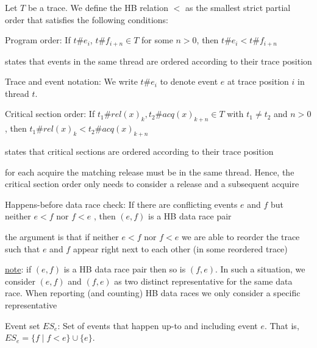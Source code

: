 \documentclass[landscape, a4paper]{article}
\begin{document}
\begin{minipage}[t]{0.2\linewidth}
\begin{betterlist}
\begin{betterlist}
			\item Let $T$ be a trace. We define the HB relation $<$ as the smallest strict partial order that satisfies the following conditions:
			\begin{betterlist}
				\item \alert{Program order:} If $t\#e_i$, $t\#f_{i + n} \in T$ for some $n > 0$, then $t\#e_i < t\#f_{i + n}$
				\begin{betterlist}
					\item states that events in the same thread are ordered according to their trace position
					\item \alert{Trace and event notation}: We write $t\#e_i$ to denote event $e$ at trace position $i$ in thread $t$. 
				\end{betterlist}
				\item \alert{Critical section order:} If $t_1\#rel(x)_k, t_2\#acq(x)_{k + n} \in T$ with $t_1 \ne t_2$ and $n > 0$, then $t_1\#rel(x)_k < t_2\#acq(x)_{k + n}$
				\begin{betterlist}
					\item states that critical sections are ordered according to their trace position
					\item for each acquire the matching release must be in the same thread. Hence, the critical section order only needs to consider a release and a subsequent acquire
				\end{betterlist}
				\item \script{102}{Example}
			\end{betterlist}
			\item \alert{Happens-before data race check:} If there are conflicting events $e$ and $f$ but neither $e < f$ nor $f < e$ , then $(e, f)$ is a HB data race pair
			\begin{betterlist}
				\item the argument is that if neither $e < f$ nor $f < e$ we are able to reorder the trace such that $e$ and $f$ appear right next to each other (in some reordered trace)
				\item \underline{note}: if $(e, f)$ is a HB data race pair then so is $(f, e)$. In such a situation, we consider $(e, f)$ and $(f, e)$ as two distinct representative for the same data race. When reporting (and counting) HB data races we only consider a specific representative
			\end{betterlist}
			\item \alert{Event set $ES_e$}: Set of events that happen up-to and including event $e$. That is, $ES_e = \{ f ∣ f < e \} \cup \{e\}$. \script{104}{Example}

\end{betterlist}
\end{betterlist}
\end{minipage}
\end{document}
